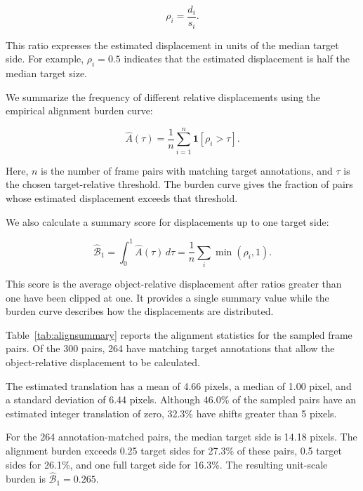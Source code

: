 \documentclass[10pt]{article}
\begin{document}
\begin{equation}
\rho_i=\frac{d_i}{s_i}.
\end{equation}

This ratio expresses the estimated displacement in units of the median target side. For example, $\rho_i=0.5$ indicates that the estimated displacement is half the median target size.

We summarize the frequency of different relative displacements using the empirical alignment burden curve:

\begin{equation}
\widehat A(\tau)
=
\frac{1}{n}
\sum_{i=1}^{n}
\mathbf{1}[\rho_i>\tau].
\end{equation}

Here, $n$ is the number of frame pairs with matching target annotations, and $\tau$ is the chosen target-relative threshold. The burden curve gives the fraction of pairs whose estimated displacement exceeds that threshold.

We also calculate a summary score for displacements up to one target side:

\begin{equation}
\widehat{\mathcal B}_{1}
=
\int_0^1
\widehat A(\tau)\,d\tau
=
\frac{1}{n}
\sum_i
\min(\rho_i,1).
\end{equation}

This score is the average object-relative displacement after ratios greater than one have been clipped at one. It provides a single summary value while the burden curve describes how the displacements are distributed.

Table~\ref{tab:alignsummary} reports the alignment statistics for the sampled frame pairs. Of the 300 pairs, 264 have matching target annotations that allow the object-relative displacement to be calculated.

The estimated translation has a mean of 4.66 pixels, a median of 1.00 pixel, and a standard deviation of 6.44 pixels. Although 46.0\% of the sampled pairs have an estimated integer translation of zero, 32.3\% have shifts greater than 5 pixels.

For the 264 annotation-matched pairs, the median target side is 14.18 pixels. The alignment burden exceeds 0.25 target sides for 27.3\% of these pairs, 0.5 target sides for 26.1\%, and one full target side for 16.3\%. The resulting unit-scale burden is $\widehat{\mathcal B}_1=0.265$.
\end{document}
